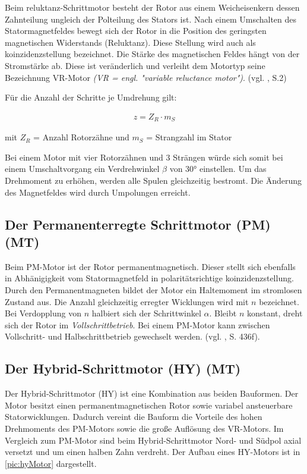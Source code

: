 Beim \acrshort{reluktanz}-Schrittmotor besteht der Rotor aus einem Weicheisenkern dessen Zahnteilung ungleich der Polteilung des Stators ist. Nach einem Umschalten des Statormagnetfeldes bewegt sich der Rotor in die Position des geringsten magnetischen Widerstands (Reluktanz). Diese Stellung wird auch als \acrshort{koinzidenzstellung} bezeichnet. Die Stärke des magnetischen Feldes hängt von der Stromstärke ab. Diese ist veränderlich und verleiht dem Motortyp seine Bezeichnung VR-Motor \textit{(VR = engl. "variable reluctance motor")}. (vgl. \cite{schrittmotorBa}, S.2)

Für die Anzahl der Schritte je Umdrehung gilt: 

\begin{align}
	z = Z_R\cdot m_S 
\end{align}
\begin{center}
	mit $Z_R$ = Anzahl Rotorzähne und  $m_S$  = Strangzahl im Stator
\end{center}

Bei einem Motor mit vier Rotorzähnen und 3 Strängen würde sich somit bei einem Umschaltvorgang ein Verdrehwinkel $\beta$ von 30° einstellen. Um das Drehmoment zu erhöhen, werden alle Spulen gleichzeitig bestromt. Die Änderung des Magnetfeldes wird durch Umpolungen erreicht. 

\subsection{Der Permanenterregte Schrittmotor (PM) (MT)}
Beim PM-Motor ist der Rotor permanentmagnetisch. Dieser stellt sich ebenfalls in Abhänigigkeit vom Statormagnetfeld in polaritätsrichtige \acrshort{koinzidenzstellung}. Durch den Permanentmagneten bildet der Motor ein Haltemoment im stromlosen Zustand aus. Die Anzahl gleichzeitig erregter Wicklungen wird mit $n$ bezeichnet. Bei Verdopplung von $n$ halbiert sich der Schrittwinkel $\alpha$. Bleibt $n$ konstant, dreht sich der Rotor im \textit{Vollschrittbetrieb}. Bei einem PM-Motor kann zwischen Vollschritt- und Halbschrittbetrieb gewechselt werden. (vgl. \cite{kleinantriebe}, S. 436f). \newpage

\subsection{Der Hybrid-Schrittmotor (HY) (MT)}
Der Hybrid-Schrittmotor (HY) ist eine Kombination aus beiden Bauformen. Der Motor besitzt einen permanentmagnetischen Rotor sowie variabel ansteuerbare Statorwicklungen. Dadurch vereint die Bauform die Vorteile des hohen Drehmoments des PM-Motors sowie die große Auflösung des VR-Motors. Im Vergleich zum PM-Motor sind beim Hybrid-Schrittmotor Nord- und Südpol axial versetzt und um einen halben Zahn verdreht. Der Aufbau eines HY-Motors ist in \autoref{pic:hyMotor} dargestellt. 


